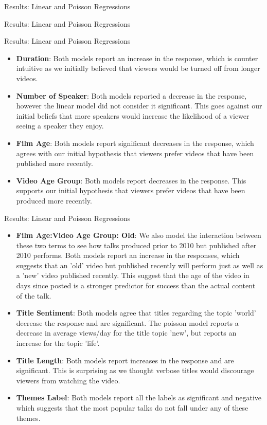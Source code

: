 \begin{frame}{Results: Linear and Poisson Regressions}
    
\end{frame}
\begin{frame}{Results: Linear and Poisson Regressions}
	
\end{frame}
\begin{frame}{Results: Linear and Poisson Regressions}
\begin{itemize}
	\item \textbf{Duration}: Both models report an increase in the response, which is counter intuitive as we initially believed that viewers would be turned off from longer videos.
	\item \textbf{Number of Speaker}: Both models reported a decrease in the response, however the linear model did not consider it significant. This goes against our initial beliefs that more speakers would increase the likelihood of a viewer seeing a speaker they enjoy.
	\item \textbf{Film Age}: Both models report significant decreases in the response, which agrees with our initial hypothesis that viewers prefer videos that have been published more recently. 
	\item \textbf{Video Age Group}: Both models report decreases in the response. This supports our initial hypothesis that viewers prefer videos that have been produced more recently.
\end{itemize}
\end{frame}

\begin{frame}{Results: Linear and Poisson Regressions}
	\begin{itemize}
		\item \textbf{Film Age:Video Age Group: Old}: We also model the interaction between these two terms to see how talks produced prior to 2010 but published after 2010 performs. Both models report an increase in the responses, which suggests that an 'old' video but published recently will perform just as well as a 'new' video published recently. This suggest that the age of the video in days since posted is a stronger predictor for success than the actual content of the talk. 
		\item \textbf{Title Sentiment}: Both models agree that titles regarding the topic 'world' decrease the response and are significant. The poisson model reports a decrease in average views/day for the title topic 'new', but reports an increase for the topic 'life'.
		\item \textbf{Title Length}: Both models report increases in the response and are significant. This is surprising as we thought verbose titles would discourage viewers from watching the video. 
		\item \textbf{Themes Label}: Both models report all the labels as significant and negative which suggests that the most popular talks do not fall under any of these themes. 
	\end{itemize}
\end{frame}
